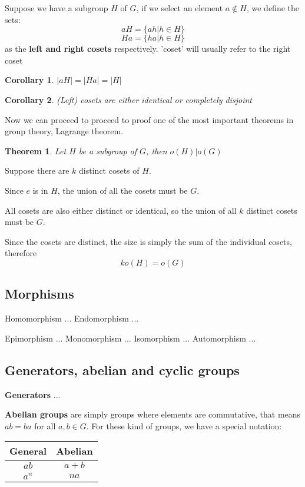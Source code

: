 \documentclass{report}
\newtheorem{theorem}{Theorem}[section]
\newtheorem{corollary}{Corollary}[theorem]
\begin{document}
Suppose we have a subgroup $H$ of $G$, if we select an element $a\notin H$, we define the sets:
$$aH=\{ah|h\in H\}$$
$$Ha=\{ha|h\in H\}$$
as the \textbf{left and right cosets} respectively. 'coset' will usually refer to the right coset

\begin{corollary}
	$|aH|=|Ha|=|H|$
\end{corollary}

\begin{corollary}
	(Left) cosets are either identical or completely disjoint 
\end{corollary}

Now we can proceed to proceed to proof one of the most important theorems in group theory, Lagrange theorem.

\begin{theorem}
	Let $H$ be a subgroup of $G$, then $o(H)|o(G)$
\end{theorem}

Suppose there are $k$ distinct cosets of $H$.

Since $e$ is in $H$, the union of all the cosets must be $G$.

All cosets are also either distinct or identical, so the union of all $k$ distinct cosets must be $G$.

Since the cosets are distinct, the size is simply the sum of the individual cosets, therefore
$$ko(H)=o(G)$$

\subsection{Morphisms}

Homomorphism ...
Endomorphism ...

Epimorphism ...
Monomorphism ...
Isomorphism ...
Automorphism ...

\subsection{Generators, abelian and cyclic groups}

\textbf{Generators} ...

\textbf{Abelian groups} are simply groups where elements are commutative, that means $ab=ba$ for all $a,b\in G$. For these kind of groups, we have a special notation:

\begin{center}
	\begin{tabular}{|c|c|}\hline
		General&Abelian\\\hline
		$ab$&$a+b$\\\hline
		$a^n$&$na$\\\hline
	\end{tabular}
\end{center}
\end{document}
